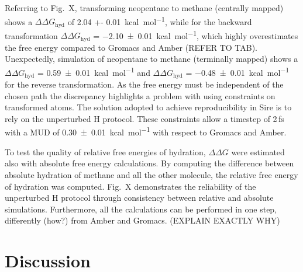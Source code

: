 \documentclass[journal=jctcce,manuscript=article]{achemso}
\begin{document}
Referring to Fig.\ X, transforming neopentane to methane (centrally
mapped) shows a $\Delta\Delta G_{\mathrm{hyd}}$ of \SI{2.04 +-
  0.01}{kcal.mol^{-1}}, while for the backward transformation
$\Delta\Delta G_{\mathrm{hyd}}$ = \SI{-2.10 +- 0.01}{kcal.mol^{-1}},
which highly overestimates the free energy compared to Gromacs and
Amber (REFER TO TAB). Unexpectedly, simulation of neopentane to
methane (terminally mapped) shows a $\Delta\Delta G_{\mathrm{hyd}}$ =
\SI{0.59 +- 0.01}{kcal.mol^{-1}} and $\Delta\Delta G_{\mathrm{hyd}}$ =
\SI{-0.48 +- 0.01}{kcal.mol^{-1}} for the reverse transformation.  As
the free energy must be independent of the chosen path the discrepancy
highlights a problem with using constraints on transformed atoms.  The
solution adopted to achieve reproducibility in Sire is to rely on the
unperturbed H protocol.  These constraints allow a timestep of 2\,fs
with a MUD of \SI{0.30 +- 0.01}{kcal.mol^{-1}} with respect to Gromacs
and Amber.

To test the quality of relative free energies of hydration,
$\Delta\Delta G$ were estimated also with absolute free energy
calculations.  By computing the difference between absolute hydration
of methane and all the other molecule, the relative free energy of
hydration was computed.  Fig.\ X demonstrates the reliability of the
unperturbed H protocol through consistency between relative and
absolute simulations.  Furthermore, all the calculations can be
performed in one step, differently (how?) from Amber and Gromacs.
(EXPLAIN EXACTLY WHY)


\section{Discussion}
\label{sec:discuss}






\end{document}
